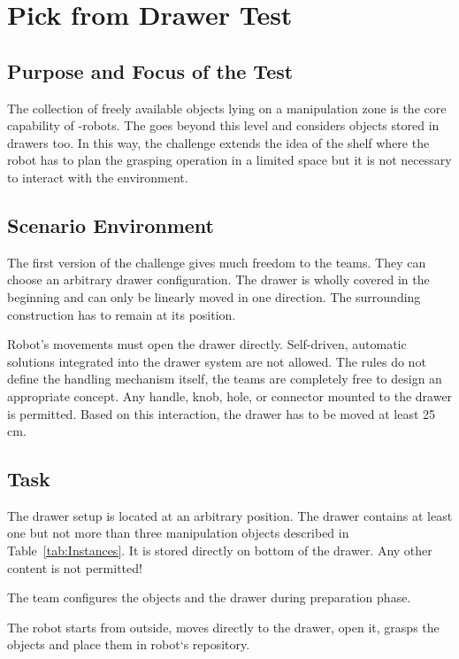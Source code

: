 \newpage
\section{Pick from Drawer Test}


\subsection{Purpose and Focus of the Test}
The collection of freely available objects lying on a manipulation zone is the core capability of \RCAW-robots. The  goes beyond this level and considers objects stored in drawers too. In this way, the challenge
extends the idea of the shelf where the robot has to plan the grasping operation in a limited space but it is not necessary to interact with the environment.

\subsection{Scenario Environment}
The first version of the challenge gives much freedom to the teams. They can choose an arbitrary drawer configuration. The drawer is wholly covered in the beginning and can only be linearly moved in one direction. The surrounding construction has to remain at its position.

\par
Robot's movements must open the drawer directly. Self-driven, automatic solutions integrated into the drawer system are not allowed.
The rules do not define the handling mechanism itself, the teams are completely free to design an appropriate concept. Any handle, knob, hole, or connector mounted to the drawer is permitted. Based on this interaction, the drawer has to be moved at least 25 cm.

\subsection{Task}
The drawer setup is located at an arbitrary position. The drawer contains at least one but not more than three  manipulation objects described in Table~\ref{tab:Instances}. It is stored directly on bottom of the drawer. Any other content is not permitted!

The team configures the objects and the drawer during preparation phase.

The robot starts from outside, moves directly to the drawer, open it, grasps the objects and place them in robot`s repository.

